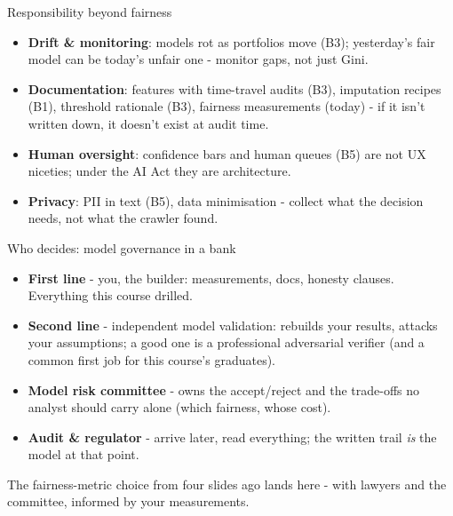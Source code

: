 \documentclass[10pt,aspectratio=169]{beamer}
\begin{document}
\begin{frame}{Responsibility beyond fairness}
  \begin{itemize}
    \item \textbf{Drift \& monitoring}: models rot as portfolios move
          (B3); yesterday's fair model can be today's unfair one -
          monitor \alert{gaps}, not just Gini.
    \item \textbf{Documentation}: features with time-travel audits (B3),
          imputation recipes (B1), threshold rationale (B3), fairness
          measurements (today) - if it isn't written down, it doesn't
          exist at audit time.
    \item \textbf{Human oversight}: confidence bars and human queues (B5)
          are not UX niceties; under the AI Act they are architecture.
    \item \textbf{Privacy}: PII in text (B5), data minimisation -
          collect what the decision needs, not what the crawler found.
  \end{itemize}
\end{frame}

\begin{frame}{Who decides: model governance in a bank}
  \begin{itemize}
    \item \textbf{First line} - you, the builder: measurements, docs,
          honesty clauses. Everything this course drilled.
    \item \textbf{Second line} - independent \alert{model validation}:
          rebuilds your results, attacks your assumptions; a good one is a
          professional adversarial verifier (and a common first job for
          this course's graduates).
    \item \textbf{Model risk committee} - owns the accept/reject and the
          trade-offs no analyst should carry alone (which fairness, whose
          cost).
    \item \textbf{Audit \& regulator} - arrive later, read everything;
          the written trail \emph{is} the model at that point.
  \end{itemize}
  \vspace{0.4em}
  \begin{center}\small
    The fairness-metric choice from four slides ago lands \alert{here} -
    with lawyers and the committee, informed by your measurements.
  \end{center}
\end{frame}
\end{document}
